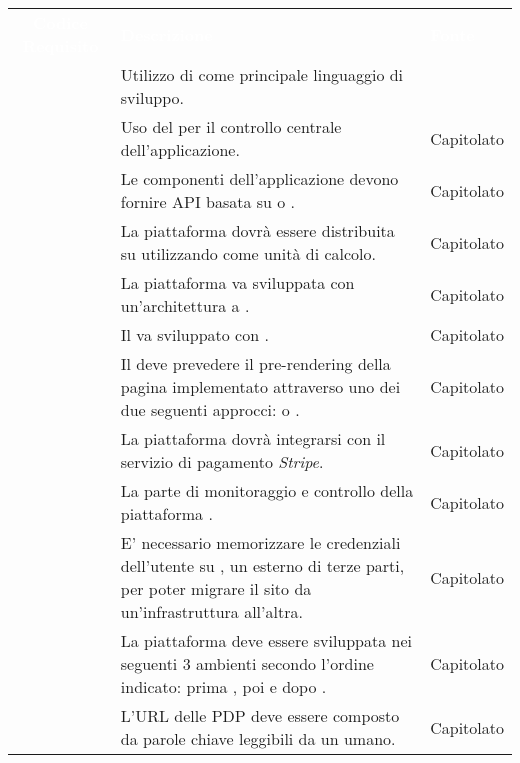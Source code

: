 \renewcommand{\arraystretch}{1.5}
\begin{longtable}{|c C{9.5cm} C{2.5cm}|} 
	
	\textcolor{white}{\textbf{Codice Requisito}}&
	\textcolor{white}{\textbf{Descrizione}}&
	\textcolor{white}{\textbf{Fonte}}\\
	 & Utilizzo di  come principale linguaggio di sviluppo. &  \\
	
	 & Uso del   per il controllo centrale dell'applicazione. & Capitolato \\
	
	 & Le componenti dell'applicazione devono fornire API basata su  o . & Capitolato \\
	
	 & La piattaforma dovrà essere distribuita su  utilizzando  come unità di calcolo. & Capitolato \\
	
	 & La piattaforma va sviluppata con un'architettura a . & Capitolato \\
	
	 & Il  va sviluppato con . & Capitolato \\
	
	 & Il  deve prevedere il pre-rendering della pagina  implementato attraverso uno dei due seguenti approcci:  o . & Capitolato \\
	
	 & La piattaforma dovrà integrarsi con il servizio di pagamento \textit{Stripe}. & Capitolato \\
	
	 & La parte di monitoraggio e controllo della piattaforma . & Capitolato \\
	
	 & E' necessario memorizzare le credenziali dell'utente su , un  esterno di terze parti, per poter migrare il sito da un'infrastruttura all'altra. & Capitolato \\
	
	 & La piattaforma deve essere sviluppata nei seguenti 3 ambienti secondo l'ordine indicato: prima , poi  e dopo . & Capitolato \\
		
	 &L'URL delle PDP deve essere composto da parole chiave leggibili da un umano. & Capitolato \\
\end{longtable}
